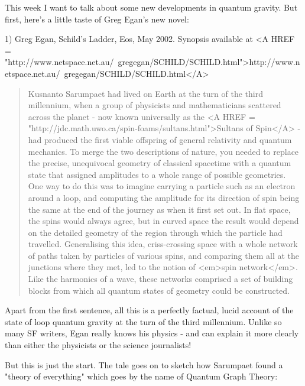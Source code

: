 



This week I want to talk about some new developments in quantum 
gravity.  But first, here's a little taste of Greg Egan's new novel:


 1) Greg Egan, Schild's Ladder, Eos, May 2002.  Synopsis available
at <A HREF = "http://www.netspace.net.au/~gregegan/SCHILD/SCHILD.html">http://www.netspace.net.au/~gregegan/SCHILD/SCHILD.html</A>

\begin{quote}
    Kusnanto Sarumpaet had lived on Earth at the turn of the
    third millennium, when a group of physicists and mathematicians
    scattered across the planet - now known universally as the 
    <A HREF = "http://jdc.math.uwo.ca/spin-foams/sultans.html">Sultans of Spin</A> - had produced the first viable offspring of
    general relativity and quantum mechanics.  To merge the two
    descriptions of nature, you needed to replace the precise,
    unequivocal geometry of classical spacetime with a quantum 
    state that assigned amplitudes to a whole range of possible
    geometries.  One way to do this was to imagine carrying a
    particle such as an electron around a loop, and computing 
    the amplitude for its direction of spin being the same at the
    end of the journey as when it first set out.  In flat space,
    the spins would always agree, but in curved space the result
    would depend on the detailed geometry of the region through
    which the particle had travelled.  Generalising this idea, 
    criss-crossing space with a whole network of paths taken by
    particles of various spins, and comparing them all at the 
    junctions where they met, led to the notion of <em>spin network</em>.
    Like the harmonics of a wave, these networks comprised a set  
    of building blocks from which all quantum states of geometry
    could be constructed.
\end{quote}
    

Apart from the first sentence, all this is a perfectly factual, lucid
account of the state of loop quantum gravity at the turn of the third
millennium.  Unlike so many SF writers, Egan really knows his physics -
and can explain it more clearly than either the physicists or the
science journalists!  

But this is just the start.  The tale goes on to sketch how Sarumpaet
found a "theory of everything" which goes by the name of
Quantum Graph Theory:


